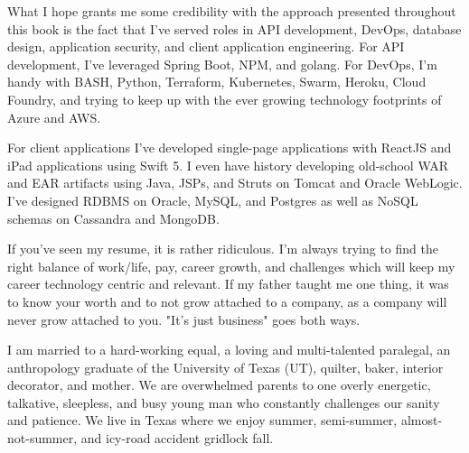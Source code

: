 What I hope grants me some credibility with the approach presented throughout this book is the fact that I've served roles in API development, DevOps, database design, application security, and client application engineering.  For API development, I've leveraged Spring Boot, NPM, and golang.  For DevOps, I'm handy with BASH, Python, Terraform, Kubernetes, Swarm, Heroku, Cloud Foundry, and trying to keep up with the ever growing technology footprints of Azure and AWS.

For client applications I've developed single-page applications with ReactJS and iPad applications using Swift 5.  I even have history developing old-school WAR and EAR artifacts using Java, JSPs, and Struts on Tomcat and Oracle WebLogic.  I've designed RDBMS on Oracle, MySQL, and Postgres as well as NoSQL schemas on Cassandra and MongoDB.

If you've seen my resume, it is rather ridiculous.  I'm always trying to find the right balance of work/life, pay, career growth, and challenges which will keep my career technology centric and relevant.  If my father taught me one thing, it was to know your worth and to not grow attached to a company, as a company will never grow attached to you.  "It's just business" goes both ways.

I am married to a hard-working equal, a loving and multi-talented paralegal, an anthropology graduate of the University of Texas (UT), quilter, baker, interior decorator, and mother.  We are overwhelmed parents to one overly energetic, talkative, sleepless, and busy young man who constantly challenges our sanity and patience.  We live in Texas where we enjoy summer, semi-summer, almost-not-summer, and icy-road accident gridlock fall.
